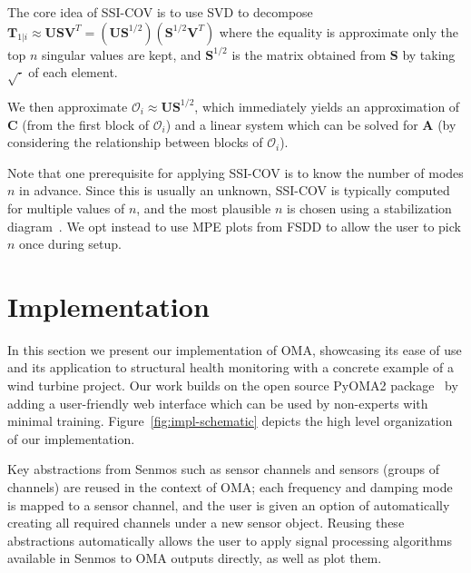 \documentclass[journal,a4paper]{IEEEtran}
\begin{document}
The core idea of SSI-COV is to use SVD to decompose $\mathbf{T}_{1|i} \approx \mathbf{U}\mathbf{S}\mathbf{V}^T = (\mathbf{U}\mathbf{S}^{1/2})(\mathbf{S}^{1/2}\mathbf{V}^T)$ where the equality is approximate only the top $n$ singular values are kept, and $\mathbf{S}^{1/2}$ is the matrix obtained from $\mathbf{S}$ by taking $\sqrt{\cdot}$ of each element.

We then approximate $\mathcal{O}_i \approx \mathbf{U}\mathbf{S}^{1/2}$, which immediately yields an approximation of $\mathbf{C}$ (from the first block of $\mathcal{O}_i$) and a linear system which can be solved for $\mathbf{A}$ (by considering the relationship between blocks of $\mathcal{O}_i$).

Note that one prerequisite for applying SSI-COV is to know the number of modes $n$ in advance. Since this is usually an unknown, SSI-COV is typically computed for multiple values of $n$, and the most plausible $n$ is chosen using a stabilization diagram~\cite{Peeters01022000}.
We opt instead to use MPE plots from FSDD to allow the user to pick $n$ once during setup.

\section{Implementation}\label{sec:practical}

In this section we present our implementation of OMA, showcasing its ease of use and its application to structural health monitoring with a concrete example of a wind turbine project. Our work builds on the open source PyOMA2 package~\cite{pyoma2} by adding a user-friendly web interface which can be used by non-experts with minimal training. Figure~\ref{fig:impl-schematic} depicts the high level organization of our implementation.



Key abstractions from Senmos such as sensor channels and sensors (groups of channels) are reused in the context of OMA; each frequency and damping mode is mapped to a sensor channel, and the user is given an option of automatically creating all required channels under a new sensor object. Reusing these abstractions automatically allows the user to apply signal processing algorithms available in Senmos to OMA outputs directly, as well as plot them.
\end{document}
